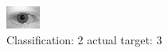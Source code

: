 \begin{figure}[h!]
\begin{center}
\includegraphics[width=0.60\columnwidth]{figures/ID655_class_2_target_3.png}
\end{center}
\caption{ Classification: 2 actual target: 3}
\label{fig:ID655_class_2_target_3}
\end{figure}
